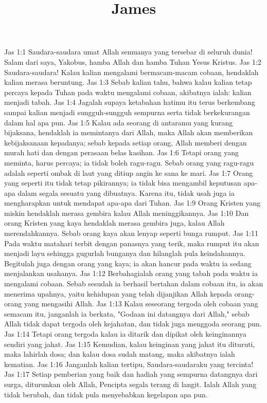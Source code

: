 

\title{James}

Jas 1:1  Saudara-saudara umat Allah semuanya yang tersebar di seluruh dunia! Salam dari saya, Yakobus, hamba Allah dan hamba Tuhan Yesus Kristus.
Jas 1:2  Saudara-saudara! Kalau kalian mengalami bermacam-macam cobaan, hendaklah kalian merasa beruntung.
Jas 1:3  Sebab kalian tahu, bahwa kalau kalian tetap percaya kepada Tuhan pada waktu mengalami cobaan, akibatnya ialah: kalian menjadi tabah.
Jas 1:4  Jagalah supaya ketabahan hatimu itu terus berkembang sampai kalian menjadi sungguh-sungguh sempurna serta tidak berkekurangan dalam hal apa pun.
Jas 1:5  Kalau ada seorang di antaramu yang kurang bijaksana, hendaklah ia memintanya dari Allah, maka Allah akan memberikan kebijaksanaan kepadanya; sebab kepada setiap orang, Allah memberi dengan murah hati dan dengan perasaan belas kasihan.
Jas 1:6  Tetapi orang yang meminta, harus percaya; ia tidak boleh ragu-ragu. Sebab orang yang ragu-ragu adalah seperti ombak di laut yang ditiup angin ke sana ke mari.
Jas 1:7  Orang yang seperti itu tidak tetap pikirannya; ia tidak bisa mengambil keputusan apa-apa dalam segala sesuatu yang dibuatnya. Karena itu, tidak usah juga ia mengharapkan untuk mendapat apa-apa dari Tuhan.
Jas 1:9  Orang Kristen yang miskin hendaklah merasa gembira kalau Allah meninggikannya.
Jas 1:10  Dan orang Kristen yang kaya hendaklah merasa gembira juga, kalau Allah merendahkannya. Sebab orang kaya akan lenyap seperti bunga rumput.
Jas 1:11  Pada waktu matahari terbit dengan panasnya yang terik, maka rumput itu akan menjadi layu sehingga gugurlah bunganya dan hilanglah pula keindahannya. Begitulah juga dengan orang yang kaya; ia akan hancur pada waktu ia sedang menjalankan usahanya.
Jas 1:12  Berbahagialah orang yang tabah pada waktu ia mengalami cobaan. Sebab sesudah ia berhasil bertahan dalam cobaan itu, ia akan menerima upahnya, yaitu kehidupan yang telah dijanjikan Allah kepada orang-orang yang mengasihi Allah.
Jas 1:13  Kalau seseorang tergoda oleh cobaan yang semacam itu, janganlah ia berkata, "Godaan ini datangnya dari Allah," sebab Allah tidak dapat tergoda oleh kejahatan, dan tidak juga menggoda seorang pun.
Jas 1:14  Tetapi orang tergoda kalau ia ditarik dan dipikat oleh keinginannya sendiri yang jahat.
Jas 1:15  Kemudian, kalau keinginan yang jahat itu dituruti, maka lahirlah dosa; dan kalau dosa sudah matang, maka akibatnya ialah kematian.
Jas 1:16  Janganlah kalian tertipu, Saudara-saudaraku yang tercinta!
Jas 1:17  Setiap pemberian yang baik dan hadiah yang sempurna datangnya dari surga, diturunkan oleh Allah, Pencipta segala terang di langit. Ialah Allah yang tidak berubah, dan tidak pula menyebabkan kegelapan apa pun.
